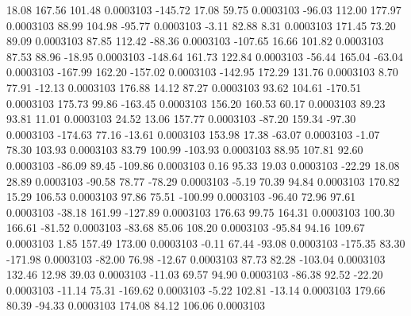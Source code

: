        18.08      167.56      101.48     0.0003103
     -145.72       17.08       59.75     0.0003103
      -96.03      112.00      177.97     0.0003103
       88.99      104.98      -95.77     0.0003103
       -3.11       82.88        8.31     0.0003103
      171.45       73.20       89.09     0.0003103
       87.85      112.42      -88.36     0.0003103
     -107.65       16.66      101.82     0.0003103
       87.53       88.96      -18.95     0.0003103
     -148.64      161.73      122.84     0.0003103
      -56.44      165.04      -63.04     0.0003103
     -167.99      162.20     -157.02     0.0003103
     -142.95      172.29      131.76     0.0003103
        8.70       77.91      -12.13     0.0003103
      176.88       14.12       87.27     0.0003103
       93.62      104.61     -170.51     0.0003103
      175.73       99.86     -163.45     0.0003103
      156.20      160.53       60.17     0.0003103
       89.23       93.81       11.01     0.0003103
       24.52       13.06      157.77     0.0003103
      -87.20      159.34      -97.30     0.0003103
     -174.63       77.16      -13.61     0.0003103
      153.98       17.38      -63.07     0.0003103
       -1.07       78.30      103.93     0.0003103
       83.79      100.99     -103.93     0.0003103
       88.95      107.81       92.60     0.0003103
      -86.09       89.45     -109.86     0.0003103
        0.16       95.33       19.03     0.0003103
      -22.29       18.08       28.89     0.0003103
      -90.58       78.77      -78.29     0.0003103
       -5.19       70.39       94.84     0.0003103
      170.82       15.29      106.53     0.0003103
       97.86       75.51     -100.99     0.0003103
      -96.40       72.96       97.61     0.0003103
      -38.18      161.99     -127.89     0.0003103
      176.63       99.75      164.31     0.0003103
      100.30      166.61      -81.52     0.0003103
      -83.68       85.06      108.20     0.0003103
      -95.84       94.16      109.67     0.0003103
        1.85      157.49      173.00     0.0003103
       -0.11       67.44      -93.08     0.0003103
     -175.35       83.30     -171.98     0.0003103
      -82.00       76.98      -12.67     0.0003103
       87.73       82.28     -103.04     0.0003103
      132.46       12.98       39.03     0.0003103
      -11.03       69.57       94.90     0.0003103
      -86.38       92.52      -22.20     0.0003103
      -11.14       75.31     -169.62     0.0003103
       -5.22      102.81      -13.14     0.0003103
      179.66       80.39      -94.33     0.0003103
      174.08       84.12      106.06     0.0003103
